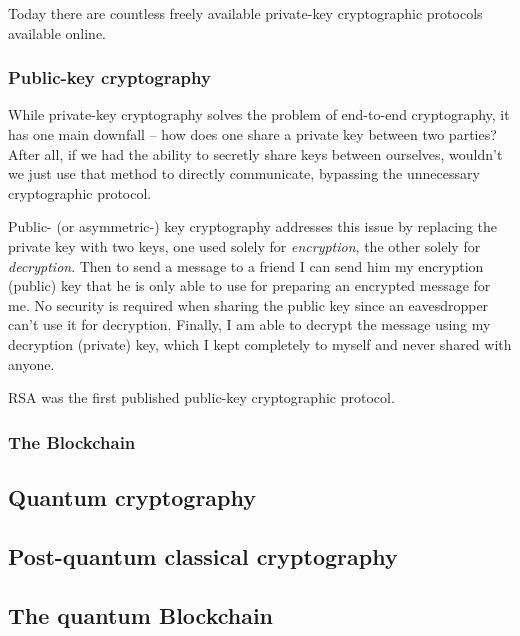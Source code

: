 Today there are countless freely available private-key cryptographic protocols available online. 



\subsubsection{Public-key cryptography}

While private-key cryptography solves the problem of end-to-end cryptography, it has one main downfall -- how does one share a private key between two parties? After all, if we had the ability to secretly share keys between ourselves, wouldn't we just use that method to directly communicate, bypassing the unnecessary cryptographic protocol.

Public- (or asymmetric-) key cryptography addresses this issue by replacing the private key with two keys, one used solely for \textit{encryption}, the other solely for \textit{decryption}. Then to send a message to a friend I can send him my encryption (public) key that he is only able to use for preparing an encrypted message for me. No security is required when sharing the public key since an eavesdropper can't use it for decryption. Finally, I am able to decrypt the message using my decryption (private) key, which I kept completely to myself and never shared with anyone.

RSA \cite{bib:RSA} was the first published public-key cryptographic protocol.

\subsubsection{The Blockchain}

\subsection{Quantum cryptography}

\subsection{Post-quantum classical cryptography}


\subsection{The quantum Blockchain}
